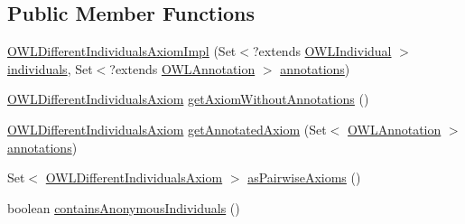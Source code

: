 \subsection*{Public Member Functions}
\begin{DoxyCompactItemize}
\item 
\hyperlink{classuk_1_1ac_1_1manchester_1_1cs_1_1owl_1_1owlapi_1_1_o_w_l_different_individuals_axiom_impl_a58c7c3043bef9669d9b446910a3797ab}{O\-W\-L\-Different\-Individuals\-Axiom\-Impl} (Set$<$?extends \hyperlink{interfaceorg_1_1semanticweb_1_1owlapi_1_1model_1_1_o_w_l_individual}{O\-W\-L\-Individual} $>$ \hyperlink{classuk_1_1ac_1_1manchester_1_1cs_1_1owl_1_1owlapi_1_1_o_w_l_nary_individual_axiom_impl_aa2ee45265a7a0c1f5cc9260ac97ac071}{individuals}, Set$<$?extends \hyperlink{interfaceorg_1_1semanticweb_1_1owlapi_1_1model_1_1_o_w_l_annotation}{O\-W\-L\-Annotation} $>$ \hyperlink{classuk_1_1ac_1_1manchester_1_1cs_1_1owl_1_1owlapi_1_1_o_w_l_axiom_impl_af6fbf6188f7bdcdc6bef5766feed695e}{annotations})
\item 
\hyperlink{interfaceorg_1_1semanticweb_1_1owlapi_1_1model_1_1_o_w_l_different_individuals_axiom}{O\-W\-L\-Different\-Individuals\-Axiom} \hyperlink{classuk_1_1ac_1_1manchester_1_1cs_1_1owl_1_1owlapi_1_1_o_w_l_different_individuals_axiom_impl_ae65d97ed46ce12bf26985efd41a8f2d3}{get\-Axiom\-Without\-Annotations} ()
\item 
\hyperlink{interfaceorg_1_1semanticweb_1_1owlapi_1_1model_1_1_o_w_l_different_individuals_axiom}{O\-W\-L\-Different\-Individuals\-Axiom} \hyperlink{classuk_1_1ac_1_1manchester_1_1cs_1_1owl_1_1owlapi_1_1_o_w_l_different_individuals_axiom_impl_a5bc42b9f58d64380c1e82f9dd4e4e3b2}{get\-Annotated\-Axiom} (Set$<$ \hyperlink{interfaceorg_1_1semanticweb_1_1owlapi_1_1model_1_1_o_w_l_annotation}{O\-W\-L\-Annotation} $>$ \hyperlink{classuk_1_1ac_1_1manchester_1_1cs_1_1owl_1_1owlapi_1_1_o_w_l_axiom_impl_af6fbf6188f7bdcdc6bef5766feed695e}{annotations})
\item 
Set$<$ \hyperlink{interfaceorg_1_1semanticweb_1_1owlapi_1_1model_1_1_o_w_l_different_individuals_axiom}{O\-W\-L\-Different\-Individuals\-Axiom} $>$ \hyperlink{classuk_1_1ac_1_1manchester_1_1cs_1_1owl_1_1owlapi_1_1_o_w_l_different_individuals_axiom_impl_a30c0cf378a89406a88705accb9be92fe}{as\-Pairwise\-Axioms} ()
\item 
boolean \hyperlink{classuk_1_1ac_1_1manchester_1_1cs_1_1owl_1_1owlapi_1_1_o_w_l_different_individuals_axiom_impl_a304c0c332e7a087b2fd947119b486091}{contains\-Anonymous\-Individuals} ()
\item 

\end{DoxyCompactItemize}
